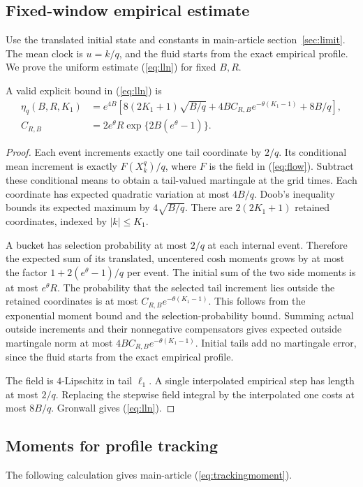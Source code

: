 \subsection{Fixed-window empirical estimate}\label{app:fluidproof}
Use the translated initial state and constants in main-article
section~\ref*{sec:limit}. The mean clock is $u=k/q$, and the fluid starts
from the exact empirical profile. We prove the uniform estimate
(\ref*{eq:lln}) for fixed $B,R$.

A valid explicit bound in (\ref*{eq:lln}) is
\begin{align*}
 \eta_q(B,R,K_1)
 &=e^{4B}\left[8(2K_1+1)\sqrt{B/q}
       +4BC_{R,B}e^{-\theta(K_1-1)}+8B/q\right],\\
 C_{R,B}&=2e^\theta R\exp\{2B(e^\theta-1)\}.
\end{align*}

\begin{proof}
Each event increments exactly one tail coordinate by $2/q$. Its conditional mean increment is exactly $F(X_k^q)/q$, where $F$ is the field in (\ref*{eq:flow}). Subtract these conditional means to obtain a tail-valued martingale at the grid times. Each coordinate has expected quadratic variation at most $4B/q$. Doob's inequality bounds its expected maximum by $4\sqrt{B/q}$. There are $2(2K_1+1)$ retained coordinates, indexed by $|k|\le K_1$.

A bucket has selection probability at most $2/q$ at each internal event. Therefore the expected sum of its translated, uncentered cosh moments grows by at most the factor $1+2(e^\theta-1)/q$ per event. The initial sum of the two side moments is at most $e^\theta R$. The probability that the selected tail increment lies outside the retained coordinates is at most $C_{R,B}e^{-\theta(K_1-1)}$. This follows from the exponential moment bound and the selection-probability bound. Summing actual outside increments and their nonnegative compensators gives expected outside martingale norm at most $4BC_{R,B}e^{-\theta(K_1-1)}$. Initial tails add no martingale error, since the fluid starts from the exact empirical profile.

The field is $4$-Lipschitz in tail $\ell_1$. A single interpolated empirical step has length at most $2/q$. Replacing the stepwise field integral by the interpolated one costs at most $8B/q$. Gronwall gives (\ref*{eq:lln}). 
\end{proof}

\subsection{Moments for profile tracking}\label{app:trackingmoments}
The following calculation gives main-article (\ref*{eq:trackingmoment}).

